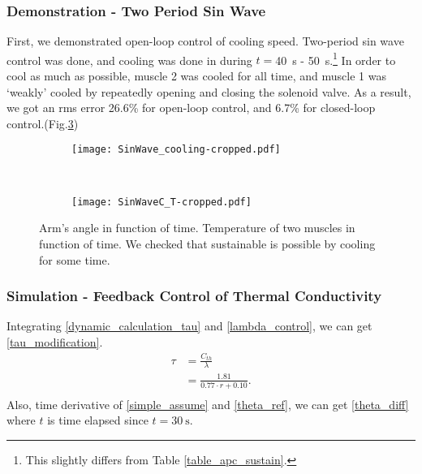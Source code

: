 \tocless \subsubsection{Demonstration - Two Period Sin Wave}
First, we demonstrated open-loop control of cooling speed. Two-period sin wave control was done, and cooling was done in during $t=$\SI{40}{\second} - \SI{50}{\second}.\footnote{This slightly differs from Table \ref{table_apc_sustain}.} In order to cool as much as possible, muscle 2 was cooled for all time, and muscle 1 was `weakly' cooled by repeatedly opening and closing the solenoid valve. As a result, we got an rms error 26.6\% for open-loop control, and 6.7\% for closed-loop control.(Fig.\ref{sustain_demo})

\begin{figure}[t]
	\centering
	\begin{subfigure}[t]{0.45\textwidth}
		\texttt{[image: SinWave\_cooling-cropped.pdf]}
		\caption{\label{SinWave_cooling}}
	\end{subfigure}
	~
	\begin{subfigure}[t]{0.44\textwidth}
		\texttt{[image: SinWaveC\_T-cropped.pdf]}
		\caption{\label{Sinwave_C_T}}
	\end{subfigure}
	\caption[Sustainable open-loop \apc demonstration]{ Arm's angle in function of time.  Temperature of two muscles in function of time. We checked that sustainable \apc is possible by cooling for some time.}
	\label{sustain_demo}
\end{figure}

\tocless \subsubsection{Simulation - Feedback Control of Thermal Conductivity}


Integrating \eqref{dynamic_calculation_tau} and \eqref{lambda_control}, we can get \eqref{tau_modification}.
\begin{equation} \label{tau_modification} 
\begin{aligned} 
\tau & = \frac{C_{th}}{\lambda} \\
& = \frac{1.81}{0.77\cdot r + 0.10}. \\ 
\end{aligned}
\end{equation}
Also, time derivative of \eqref{simple_assume} and \eqref{theta_ref}, we can get \eqref{theta_diff} where $t$ is time elapsed since $t=\SI{30}{\second}$.

